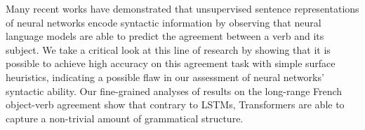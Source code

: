 Many recent works have demonstrated that unsupervised sentence representations of neural networks encode syntactic information by observing that neural language models are able to predict the agreement between a verb and its subject.  We take a critical look at this line of research by showing that it is possible to achieve high accuracy on this agreement task with simple surface heuristics, indicating a possible flaw in our assessment of neural networks' syntactic ability. Our fine-grained analyses of results on the long-range French object-verb agreement show that contrary to LSTMs, Transformers are able to capture a non-trivial amount of grammatical structure.
